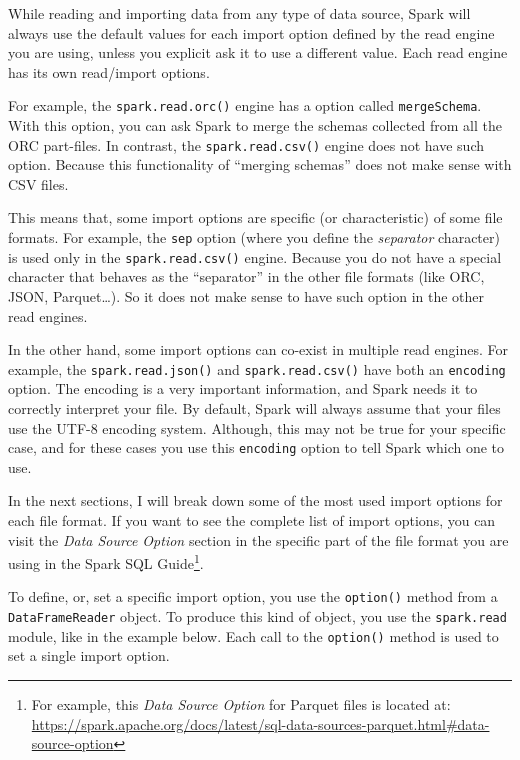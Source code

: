 \documentclass[
  11pt,
  letterpaper,
  DIV=11,
  numbers=noendperiod]{scrreprt}
\begin{document}
While reading and importing data from any type of data source, Spark
will always use the default values for each import option defined by the
read engine you are using, unless you explicit ask it to use a different
value. Each read engine has its own read/import options.

For example, the \texttt{spark.read.orc()} engine has a option called
\texttt{mergeSchema}. With this option, you can ask Spark to merge the
schemas collected from all the ORC part-files. In contrast, the
\texttt{spark.read.csv()} engine does not have such option. Because this
functionality of ``merging schemas'' does not make sense with CSV files.

This means that, some import options are specific (or characteristic) of
some file formats. For example, the \texttt{sep} option (where you
define the \emph{separator} character) is used only in the
\texttt{spark.read.csv()} engine. Because you do not have a special
character that behaves as the ``separator'' in the other file formats
(like ORC, JSON, Parquet\ldots). So it does not make sense to have such
option in the other read engines.

In the other hand, some import options can co-exist in multiple read
engines. For example, the \texttt{spark.read.json()} and
\texttt{spark.read.csv()} have both an \texttt{encoding} option. The
encoding is a very important information, and Spark needs it to
correctly interpret your file. By default, Spark will always assume that
your files use the UTF-8 encoding system. Although, this may not be true
for your specific case, and for these cases you use this
\texttt{encoding} option to tell Spark which one to use.

In the next sections, I will break down some of the most used import
options for each file format. If you want to see the complete list of
import options, you can visit the \emph{Data Source Option} section in
the specific part of the file format you are using in the Spark SQL
Guide\footnote{For example, this \emph{Data Source Option} for Parquet
  files is located at:
  \url{https://spark.apache.org/docs/latest/sql-data-sources-parquet.html\#data-source-option}}.

To define, or, set a specific import option, you use the
\texttt{option()} method from a \texttt{DataFrameReader} object. To
produce this kind of object, you use the \texttt{spark.read} module,
like in the example below. Each call to the \texttt{option()} method is
used to set a single import option.
\end{document}
